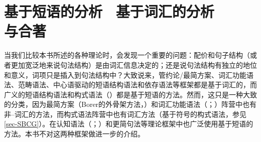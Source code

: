 \chapter[基于短语的分析 \normalfont{vs.}\ 基于词汇的分析]{基于短语的分析 \ 基于词汇的分析\\[4mm]\large{与合著}}
\label{Abschnitt-Phrasal-Lexikalisch}\label{chap-phrasal}

当我们比较本书所述的各种理论时，会发现一个重要的问题：配价和句子结构（或者更加宽泛地来说句法结构）是由词汇信息决定的；还是说句法结构有独立的地位和意义，词项只是插入到句法结构中？大致说来，管约论/最简方案、词汇功能语法、范畴语法、中心语驱动的短语结构语法和依存语法等框架都是基于词汇的，而广义的短语结构语法和构式语法（\citealp{Goldberg95a,Goldberg2003b,Tomasello2003a,Tomasello2006c,Croft2001a}）都是基于短语的方法。然而，这只是一种大致的分类，因为最简方案（Borer的外骨架方法，\citeyear{Borer2003a-u}）和词汇功能语法（\citealp{Alsina96a}；\citealp{ADT2008a,ADT2013a}）阵营中也有非--词汇的方法，而构式语法阵营中也有词汇方法（基于符号的构式语法，参见\ref{sec-SBCG}）。在认知语法（\citealp{Dabrowska2001a}；\citealp[]{Langacker2009a}）和更简句法\citep{CJ2005a,Jackendoff2008a}等理论框架中也广泛使用基于短语的方法。本书不对这两种框架做进一步的介绍。

